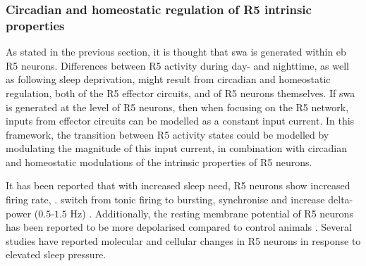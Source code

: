 \documentclass[../main.tex]{subfiles}
\begin{document}
\subsubsection{Circadian and homeostatic regulation of R5 intrinsic properties} \label{subsubsec:circ_and_hemeo_r5}

As stated in the previous section, it is thought that \gls{swa} is generated within \gls{eb} R5 neurons.
Differences between R5 activity during day- and nighttime, as well as following sleep deprivation, might result from circadian and homeostatic regulation, both of the R5 effector circuits, and of R5 neurons themselves. If \gls{swa} is generated at the level of R5 neurons, then when focusing on the R5 network, inputs from effector circuits can be modelled as a constant input current. In this framework, the transition between R5 activity states could be modelled by modulating the magnitude of this input current, in combination with circadian and homeostatic modulations of the intrinsic properties of R5 neurons.

It has been reported that with increased sleep need, R5 neurons show increased firing rate, \cite{raccugliaNetworkSpecificSynchronizationElectrical2019,liuSleepDriveEncoded2016}.
switch from tonic firing to bursting, synchronise and increase delta-power ($0.5$-$1.5$ Hz) \cite{raccugliaNetworkSpecificSynchronizationElectrical2019}. Additionally, the resting membrane potential of R5 neurons has been reported to be more depolarised compared to control animals \cite{liuSleepDriveEncoded2016}. Several studies have reported molecular and cellular changes in R5 neurons in response to elevated sleep pressure.
\end{document}
